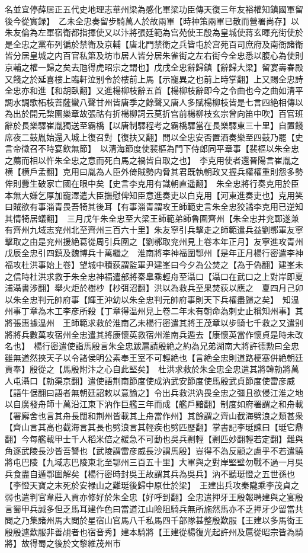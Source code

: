 名並宜停薛居正五代史地理志華州梁為感化軍梁功臣傳天復三年友裕權知鎮國軍留後今從實録】　乙未全忠奏留步騎萬人於故兩軍【時神策兩軍已散而營署尚存】以朱友倫為左軍宿衛都指揮使又以汴將張廷範為宫苑使王殷為皇城使蔣玄暉充街使於是全忠之黨布列徧於禁衛及京輔【唐北門禁衛之兵皆屯於宫苑百司庶府及南衙諸衛皆分居皇城之内百官私第及坊市居人皆分居朱雀街之左右街今全忠悉以腹心為使則京輔之權一歸之矣去虺得虎昭宗之謂也】戊戌全忠辭歸鎮【辭歸大梁】留宴壽春殿又餞之於延喜樓上臨軒泣别令於樓前上馬【示寵異之也前上時掌翻】上又賜全忠詩全忠亦和進【和胡臥翻】又進楊柳枝辭五首【楊柳枝辭即今之令曲也今之曲如清平調水調歌柘枝菩薩蠻八聲甘州皆唐季之餘聲又唐人多賦楊柳枝皆是七言四絶相傳以為出於開元棃園樂章故張祜有折楊柳詞云莫折宫前楊柳枝玄宗曾向笛中吹】百官班辭於長樂驛崔胤獨送至霸橋【以唐制驛程考之霸橋驛當在長樂驛東三十里】自置餞席夜二鼓胤始還入城上復召對【復扶又翻】問以全忠安否置酒奏樂至四鼓乃罷【史言帝徵召不時宴飲無節】　以清海節度使裴樞為門下侍郎同平章事【裴樞以朱全忠之薦而相以忤朱全忠之意而死白馬之禍皆自取之也】　李克用使者還晉陽言崔胤之横【横戶孟翻】克用曰胤為人臣外倚賊勢内脅其君既執朝政又握兵權權重則怨多勢侔則釁生破家亡國在眼中矣【史言李克用有識朝直遥翻】　朱全忠將行奏克用於臣本無大嫌乞厚加寵澤遣大臣撫慰俾知臣意進奏吏以白克用【河東進奏吏也】克用笑曰賊欲有事淄青畏吾犄其後耳【有事淄青謂攻王師範史言朱全忠狡譎李克用已逆知其情犄居蟻翻】　三月戊午朱全忠至大梁王師範弟師魯圍齊州【朱全忠并兖鄆遂兼有齊州九域志兖州北至齊州三百六十里】朱友寧引兵擊走之師範遣兵益劉鄩軍友寧擊取之由是兖州援絶葛從周引兵圍之【劉鄩取兖州見上卷本年正月】友寧進攻青州戊辰全忠引四鎮及魏博兵十萬繼之　淮南將李神福圍鄂州【是年正月楊行密遣李神福攻杜洪事始上卷】望城中積荻謂監軍尹建峯曰今夕為公焚之【為于偽翻】建峯未之信時杜洪求救于朱全忠神福遣部將秦臯乘輕舟至灄口【灄口在武口之上對岸即夏浦灄書涉翻】舉火炬於樹杪【杪弭沼翻】洪以為救兵至果焚荻以應之　夏四月己卯以朱全忠判元帥府事【輝王沖幼以朱全忠判元帥府事則天下兵權盡歸之矣】　知温州事丁章為木工李彦所殺【丁章得温州見上卷二年未有朝命為刺史止稱知州事】其將張惠據温州　王師範求救於淮南乙未楊行密遣其將王茂章以步騎七千救之又遣别將將兵數萬攻宿州全忠遣其將康懷英救宿州淮南兵遁去【康懷英當作懷貞是時未改名也】　楊行密遣使詣馬殷言朱全忠跋扈請殷絶之約為兄弟湖南大將許德勲曰全忠雖無道然挾天子以令諸侯明公素奉王室不可輕絶也【言絶全忠則道路梗塞併絶朝廷貢奉】殷從之【馬殷附汴之心自此堅矣】　杜洪求救於朱全忠全忠遣其將韓勍將萬人屯灄口【勍渠京翻】遣使語荆南節度使成汭武安節度使馬殷武貞節度使雷彦威【語牛倨翻曰語者無朝廷詔敕以意諭之】令出兵救洪汭畏全忠之彊且欲侵江淮之地以自廣發舟師十萬沿江東下汭作巨艦三年而成【艦戶黯翻】制度如府署謂之和舟載【署廨舍也言其舟長闊和荆州皆載其上舟當作州】其餘謂之齊山截海劈浪之類甚衆【齊山言其高也截海言其長也劈浪言其輕疾也劈匹歷翻】掌書記李珽諫曰【珽它鼎翻】今每艦載甲士千人稻米倍之緩急不可動也吳兵剽輕【剽匹妙翻輕若定翻】難與角逐武陵長沙皆吾讐也【武陵謂雷彦威長沙謂馬殷】豈得不為反顧之慮乎不若遣驍將屯巴陵【九域志巴陵東北至鄂州三百五十里】大軍與之對岸堅壁勿戰不過一月吳兵食盡自遁鄂圍解矣【楊行密時封吳王故謂其兵為吳兵】汭不聽珽憕之五世孫也【李憕天寶之末死於安禄山之難珽後歸中原仕於梁】　王建出兵攻秦隴乘李茂貞之弱也遣判官韋莊入貢亦修好於朱全忠【好呼到翻】全忠遣押牙王殷報聘建與之宴殷言蜀甲兵誠多但乏馬耳建作色曰當道江山險阻騎兵無所施然馬亦不乏押牙少留當共閲之乃集諸州馬大閲於星宿山官馬八千私馬四千部隊甚整殷歎服【王建以多馬衒王殷殷遽歎服非善覘者也宿音秀】建本騎將【王建從楊復光起許州及扈從昭宗皆為騎將】故得蜀之後於文黎維茂州市